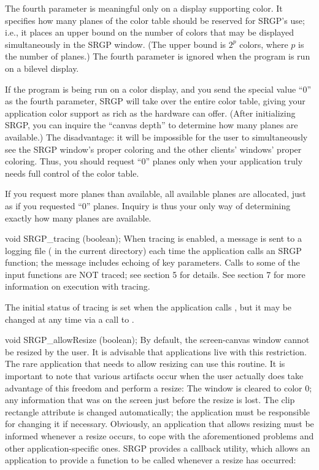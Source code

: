 \indentpar 
The fourth parameter is meaningful only on a display supporting color.  It
specifies how many planes of the color table should be reserved for SRGP's use;
i.e., it places an upper bound on the number of colors that may be displayed
simultaneously in the SRGP window.  (The upper bound is $2^p$ colors, where $p$
is the number of planes.)  The fourth parameter is ignored when the program is
run on a bilevel display.

\indentpar
If the program is being run on a color display, and you send the special value
``0'' as the fourth parameter, SRGP will take over the entire color table,
giving your application color support as rich as the hardware can offer.
(After initializing SRGP, you can inquire the ``canvas depth'' to determine how
many planes are available.)  The disadvantage: it will be impossible for the
user to simultaneously see the SRGP window's proper coloring and the other
clients' windows' proper coloring.  Thus, you should request ``0'' planes only
when your application truly needs full control of the color table.

\indentpar
If you request more planes than available, all available planes are allocated,
just as if you requested ``0'' planes.  Inquiry is thus your only way of
determining exactly how many planes are available.

\nextsynopsis
void SRGP_tracing (boolean);
\endsynopsis
When tracing is enabled, a message is sent to a logging file (
in the current directory) each time the application calls an SRGP function;
the message includes echoing of key parameters.
Calls to some of the input functions are NOT traced; see section 5
for details.  See section 7 for more information on execution with tracing.

\indentpar
The initial status of tracing is set when the application calls
, but it may be changed at any time via a call to
.


\nextsynopsis
void SRGP_allowResize (boolean);
\endsynopsis
By default, the screen-canvas window cannot be resized by the user.  It is
advisable that applications live with this restriction.  The rare application
that needs to allow resizing can use this routine.  It is important to note
that various artifacts occur when the user actually does take advantage of this
freedom and perform a resize:
 The window is cleared to color 0; any information that was on the
screen just before the resize is lost.
 The clip rectangle attribute is  changed automatically;
the application must be responsible for changing it if necessary.
\newpar
Obviously, an application that allows resizing must be informed whenever a
resize occurs, to cope with the aforementioned problems and other
application-specific ones.  SRGP provides a callback utility, which allows an
application to provide a function to be called whenever a resize has occurred:


